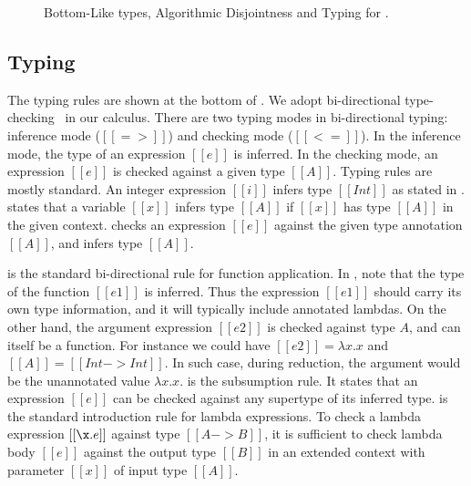 \begin{figure}[t]
  \begin{small}
    \centering
  \end{small}
  \begin{small}
    \centering
  \end{small}
  \begin{small}
    \centering
  \end{small}
  \caption{Bottom-Like types, Algorithmic Disjointness and Typing for \cal.}
  \label{fig:union:disj-typ}
\end{figure}


\subsection{Typing}
\label{sec:union:typ}
The typing rules are shown at the bottom of .
We adopt bi-directional type-checking~\cite{pierce2000local} in our calculus.  There
are two typing modes in bi-directional typing: inference mode
($[[=>]]$) and checking mode ($[[<=]]$). In the inference mode, the type of
an expression $[[e]]$ is inferred.  In the checking
mode, an expression $[[e]]$ is checked against a given type $[[A]]$.
Typing rules are mostly standard. An integer
expression $[[i]]$ infers type $[[Int]]$ as stated in .
 states that a variable $[[x]]$ infers type $[[A]]$ if
$[[x]]$ has type $[[A]]$ in the given context. 
checks an expression $[[e]]$ against the given type annotation $[[A]]$,
and infers type $[[A]]$.

 is the standard bi-directional rule for
function application. In , note that the type of the
function $[[e1]]$ is inferred. Thus the expression $[[e1]]$ should carry
its own type information, and it will typically include annotated lambdas.
On the other hand, the argument expression $[[e2]]$ is checked against type $A$,
and can itself be a function. For instance we could have $[[e2]] = \lambda x. x$
and $[[A]] = [[Int->Int]]$. In such case, during reduction, the argument would be
the unannotated value $\lambda x. x$.
 is the subsumption rule. It states that an expression
$[[e]]$ can be checked against any supertype of its inferred type.
 is the standard introduction rule for lambda
expressions. To check a lambda expression $[[\x.e]]$ against type $[[A
    -> B]]$, it is sufficient to check lambda body $[[e]]$ against the
output type $[[B]]$ in an extended context with parameter $[[x]]$ of
input type $[[A]]$.

